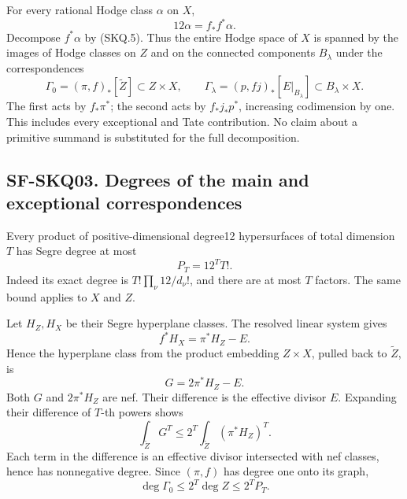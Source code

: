 For every rational Hodge class \(\alpha\) on \(X\), \[
 12\alpha=f_*f^*\alpha.
\] Decompose \(f^*\alpha\) by (SKQ.5). Thus the entire Hodge space of
\(X\) is spanned by the images of Hodge classes on \(Z\) and on the
connected components \(B_\lambda\) under the correspondences \[
 \Gamma_0=(\pi,f)_*[\widetilde Z]\subset Z\times X,\qquad
 \Gamma_\lambda=(p,fj)_*[E|_{B_\lambda}]
                  \subset B_\lambda\times X.
 \tag{SKQ.6}
\] The first acts by \(f_*\pi^*\); the second acts by \(f_*j_*p^*\),
increasing codimension by one. This includes every exceptional and Tate
contribution. No claim about a primitive summand is substituted for the
full decomposition.

\subsection{SF-SKQ03. Degrees of the main and exceptional
correspondences}\label{SF-SKQ03}

Every product of positive-dimensional degree12 hypersurfaces of total
dimension \(T\) has Segre degree at most \[
 P_T=12^T T!.
 \tag{SKQ.7}
\] Indeed its exact degree is \(T!\prod_\nu12/d_\nu!\), and there are at
most \(T\) factors. The same bound applies to \(X\) and \(Z\).

Let \(H_Z,H_X\) be their Segre hyperplane classes. The resolved linear
system gives \[
 f^*H_X=\pi^*H_Z-E.
\] Hence the hyperplane class from the product embedding \(Z\times X\),
pulled back to \(\widetilde Z\), is \[
 G=2\pi^*H_Z-E.
\] Both \(G\) and \(2\pi^*H_Z\) are nef. Their difference is the
effective divisor \(E\). Expanding their difference of \(T\)-th powers
shows \[
 \int_{\widetilde Z}G^T\le
 2^T\int_{\widetilde Z}(\pi^*H_Z)^T.
\] Each term in the difference is an effective divisor intersected with
nef classes, hence has nonnegative degree. Since \((\pi,f)\) has degree
one onto its graph, \[
 \deg\Gamma_0\le2^T\deg Z\le2^TP_T.
 \tag{SKQ.8}
\]

